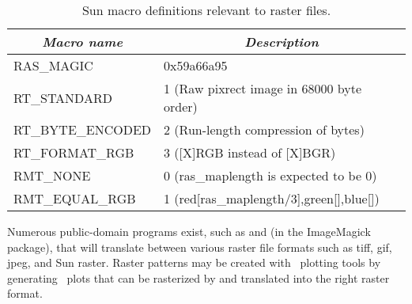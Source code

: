 \begin{table}[H]
\centering
\begin{tabular}{|l|l|}  \hline

\multicolumn{1}{|c}{\emph{Macro name}}  &       \multicolumn{1}{|c|}{\emph{Description}}        \\ \hline
RAS\_MAGIC      &       0x59a66a95  \\ \hline
RT\_STANDARD    &       1 (Raw pixrect image in 68000 byte order)  \\ \hline
RT\_BYTE\_ENCODED       &       2 (Run-length compression of bytes)  \\ \hline
RT\_FORMAT\_RGB &       3 ([X]RGB instead of [X]BGR)  \\ \hline
RMT\_NONE       &       0 (ras\_maplength is expected to be 0)  \\ \hline
RMT\_EQUAL\_RGB &       1 (red[ras\_maplength/3],green[],blue[])  \\ \hline

\end{tabular}

\caption{Sun macro definitions relevant to raster files.}
\label{tbl:sundef}
\end{table}

Numerous public-domain programs exist, such as  and
 (in the ImageMagick package), that will translate
between various raster file formats such as tiff, gif, jpeg, and
Sun raster.  Raster patterns may be created with \GMT\ plotting
tools by generating \PS\ plots that can be rasterized
by  and translated into the right raster format.
